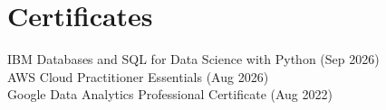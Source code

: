 \section{Certificates}
    \begin{itemize}[leftmargin=0in, label={}]
	\small{\item{\strut
		IBM Databases and SQL for Data Science with Python (Sep 2026) \\
		AWS Cloud Practitioner Essentials (Aug 2026) \\
		Google Data Analytics Professional Certificate (Aug 2022)
	}}
    \end{itemize}
